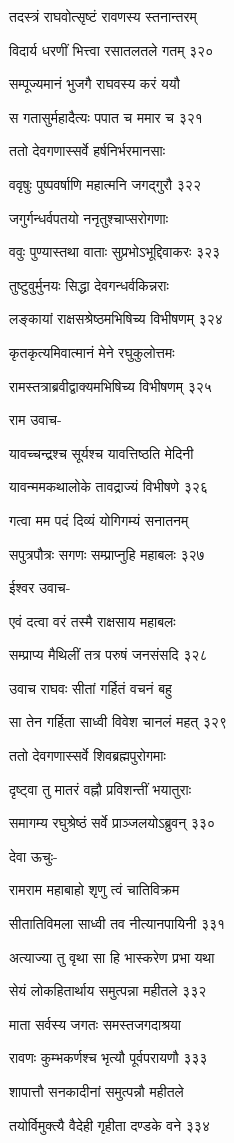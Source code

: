 तदस्त्रं राघवोत्सृष्टं रावणस्य स्तनान्तरम्

विदार्य धरणीं भित्त्वा रसातलतले गतम् ३२०

सम्पूज्यमानं भुजगै राघवस्य करं ययौ

स गतासुर्महादैत्यः पपात च ममार च ३२१

ततो देवगणास्सर्वे हर्षनिर्भरमानसाः

ववृषुः पुष्पवर्षाणि महात्मनि जगद्गुरौ ३२२

जगुर्गन्धर्वपतयो ननृतुश्चाप्सरोगणाः

ववुः पुण्यास्तथा वाताः सुप्रभोऽभूद्दिवाकरः ३२३

तुष्टुवुर्मुनयः सिद्धा देवगन्धर्वकिन्नराः

लङ्कायां राक्षसश्रेष्ठमभिषिच्य विभीषणम् ३२४

कृतकृत्यमिवात्मानं मेने रघुकुलोत्तमः

रामस्तत्राब्रवीद्वाक्यमभिषिच्य विभीषणम् ३२५

राम उवाच-

यावच्चन्द्रश्च सूर्यश्च यावत्तिष्ठति मेदिनी

यावन्ममकथालोके तावद्राज्यं विभीषणे ३२६

गत्वा मम पदं दिव्यं योगिगम्यं सनातनम्

सपुत्रपौत्रः सगणः सम्प्राप्नुहि महाबलः ३२७

ईश्वर उवाच-

एवं दत्वा वरं तस्मै राक्षसाय महाबलः

सम्प्राप्य मैथिलीं तत्र परुषं जनसंसदि ३२८

उवाच राघवः सीतां गर्हितं वचनं बहु

सा तेन गर्हिता साध्वी विवेश चानलं महत् ३२९

ततो देवगणास्सर्वे शिवब्रह्मपुरोगमाः

दृष्ट्वा तु मातरं वह्नौ प्रविशन्तीं भयातुराः

समागम्य रघुश्रेष्ठं सर्वे प्राञ्जलयोऽब्रुवन् ३३०

देवा ऊचुः-

रामराम महाबाहो शृणु त्वं चातिविक्रम

सीतातिविमला साध्वी तव नीत्यानपायिनी ३३१

अत्याज्या तु वृथा सा हि भास्करेण प्रभा यथा

सेयं लोकहितार्थाय समुत्पन्ना महीतले ३३२

माता सर्वस्य जगतः समस्तजगदाश्रया

रावणः कुम्भकर्णश्च भृत्यौ पूर्वपरायणौ ३३३

शापात्तौ सनकादीनां समुत्पन्नौ महीतले

तयोर्विमुक्त्यै वैदेही गृहीता दण्डके वने ३३४

